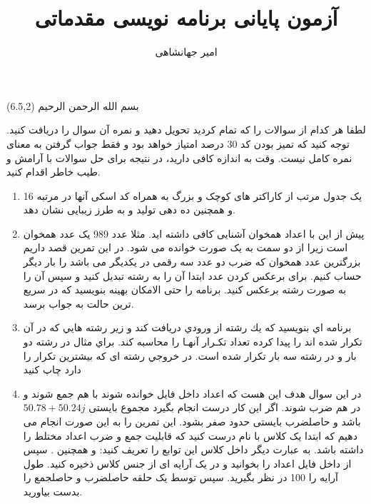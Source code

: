 \documentclass[oneside]{article}
\title{آزمون پایانی برنامه نویسی مقدماتی}
\author{امیر جهانشاهی}
\begin{document}
\maketitle

\begin{textblock}{5}(6.5,2)\nastaliqfont
\noindent\Large
بسم الله الرحمن الرحیم
\end{textblock}

\begin{tcolorbox}
لطفا هر کدام از سوالات را که تمام کردید تحویل دهید و نمره آن سوال را دریافت کنید. توجه کنید که تمیز بودن کد 30 درصد امتیاز خواهد بود و فقط جواب گرفتن به معنای نمره کامل نیست. وقت به اندازه کافی دارید، در نتیجه برای حل سوالات با آرامش و طیب خاطر اقدام کنید.
\end{tcolorbox}

\begin{enumerate}
\item
یک جدول مرتب از کاراکتر های کوچک و بزرگ به همراه کد اسکی آنها در مرتبه 16 و همچنین ده دهی تولید و به طرز زیبایی نشان دهد. 

\item
پیش از این با اعداد همخوان آشنایی کافی داشته اید. مثلا عدد 989 یک عدد همخوان است زیرا از دو سمت به یک صورت خوانده می شود. در این تمرین قصد داریم بزرگترین عدد همخوان که ضرب دو عدد سه رقمی در یکدیگر می باشد را بار دیگر حساب کنیم. برای برعکس کردن عدد ابتدا آن را به رشته 
تبدیل کنید و سپس آن را به صورت رشته برعکس کنید. برنامه را حتی الامکان بهینه بنویسید که در سریع ترین حالت به جواب برسد.

\item
برنامه اي بنويسيد كه يك رشته از ورودي دريافت كند و زير رشته هايي كه در آن تكرار شده اند را پیدا كرده تعداد تكـرار آنهـا را محاسبه كند. براي مثال 
 در رشته 
  دو بار و 
   در رشته  
سه بار تكرار شده است. در خروجي رشته ای كه بيشترين تكرار را دارد چاپ كنيد

\item
در این سوال هدف این هست که اعداد داخل فایل 
خوانده شوند با هم جمع شوند و در هم ضرب شوند. اگر این کار درست انجام بگیرد مجموع بایستی
$50.78+50.24j$
باشد و حاصلضرب بایستی حدود صفر بشود. این تمرین را به این صورت انجام می دهیم که ابتدا یک کلاس با نام 
درست کنید که قابلیت جمع و ضرب اعداد مختلط را داشته باشد. به عبارت دیگر داخل کلاس این توابع را تعریف کنید:
و همچنین
. 
سپس از داخل فایل اعداد را بخوانید و در یک آرایه ای از جنس کلاس ذخیره کنید. طول آرایه را 100 در نظر بگیرید. سپس توسط یک حلقه حاصلضرب و حاصلجمع را بدست بیاورید.


\end{enumerate}
\end{document}
